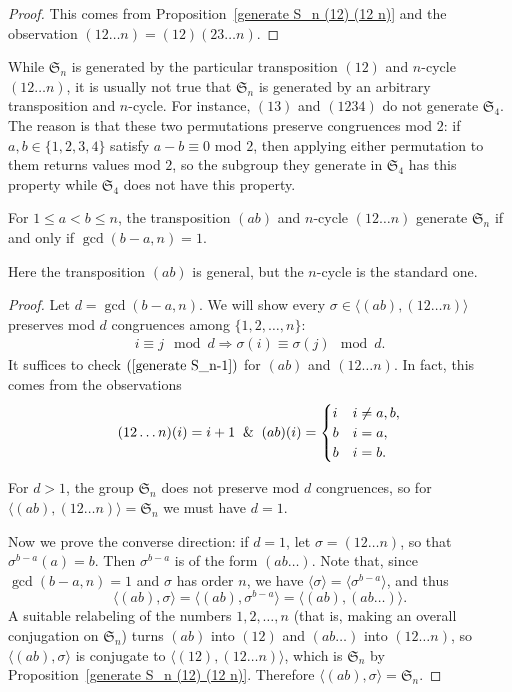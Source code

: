 \begin{proof}
This comes from Proposition~\ref{generate S_n (12) (12 n)} and the observation $(12\dots n)=(12)(23\dots n)$.
\end{proof}
While $\mathfrak{S}_n$ is generated by the particular transposition $(12)$ and $n$-cycle $(12\dots n)$, it is usually not true that $\mathfrak{S}_n$ is generated by an arbitrary transposition and $n$-cycle. For instance, $(13)$ and $(1234)$ do not generate $\mathfrak{S}_4$. The reason is that these two permutations preserve
congruences mod $2$: if $a,b\in\{1,2,3,4\}$ satisfy $a-b\equiv 0$ mod $2$, then applying either permutation to them returns values mod $2$, so the subgroup they generate in $\mathfrak{S}_4$ has this property while $\mathfrak{S}_4$ does not have this property.
\begin{proposition}\label{generate S_n (ab) n-cycle}
For $1\leq a<b\leq n$, the transposition $(ab)$ and $n$-cycle $(12\dots n)$ generate $\mathfrak{S}_n$ if and only if $\gcd(b-a,n)=1$.

\end{proposition}
Here the transposition $(ab)$ is general, but the $n$-cycle is the standard one.
\begin{proof}
Let $d=\gcd(b-a,n)$. We will show every $\sigma\in\langle(ab),(12\dots n)\rangle$ preserves mod $d$ congruences among $\{1,2,\dots,n\}$:
\begin{align}\label{generate S_n-1}
i\equiv j\mod d\Longrightarrow \sigma(i)\equiv\sigma(j)\mod d.
\end{align}
It suffices to check $(\ref{generate S_n-1})$ for $(ab)$ and $(12\dots n)$. In fact, this comes from the observations
\[(12\dots n)(i)=i+1\And (ab)(i)=\begin{cases}
i&i\neq a,b,\\
b&i=a,\\
b&i=b.
\end{cases}\]

For $d>1$, the group $\mathfrak{S}_n$ does not preserve mod $d$ congruences, so for $\langle(ab),(12\dots n)\rangle=\mathfrak{S}_n$ we must have $d=1$.\par
Now we prove the converse direction: if $d=1$, let $\sigma=(12\dots n)$, so that $\sigma^{b-a}(a)=b$. Then $\sigma^{b-a}$ is of the form $(ab\dots)$. Note that, since $\gcd(b-a,n)=1$ and $\sigma$ has order $n$, we have $\langle\sigma\rangle=\langle\sigma^{b-a}\rangle$, and thus
\[\langle(ab),\sigma\rangle=\langle(ab),\sigma^{b-a}\rangle=\langle(ab),(ab\dots)\rangle.\]
A suitable relabeling of the numbers $1,2,\dots,n$ (that is, making an overall conjugation on $\mathfrak{S}_n$) turns $(ab)$ into $(12)$ and $(ab\dots)$ into $(12\dots n)$, so $\langle(ab),\sigma\rangle$ is conjugate to $\langle(12),(12\dots n)\rangle$, which is $\mathfrak{S}_n$ by Proposition~\ref{generate S_n (12) (12 n)}. Therefore $\langle(ab),\sigma\rangle=\mathfrak{S}_n$.
\end{proof}

